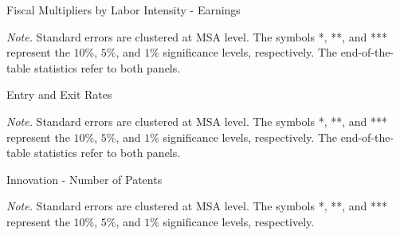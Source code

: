 \documentclass[dv_diss_main.tex]{subfiles}
\begin{document}
\newpage

\begin{table}[H]
    \begin{center}
    \caption{Fiscal Multipliers by Labor Intensity - Earnings}
    \label{tab:fm_labint}
	\resizebox{\textwidth}{!}{
    
    }
    \end{center}
        
    \footnotesize{\textit{Note. } Standard errors are clustered at MSA level. The symbols *, **, and *** represent the $10\%$, $5\%$, and $1\%$ significance levels, respectively. The end-of-the-table statistics refer to both panels.}
    
\end{table}
\newpage

\begin{table}[H]
    \begin{center}
    \caption{Entry and Exit Rates}
    \label{tab:entry_rate}
	\resizebox{!}{!}{
    
    }
    \end{center}
    \footnotesize{\textit{Note. } Standard errors are clustered at MSA level. The symbols *, **, and *** represent the $10\%$, $5\%$, and $1\%$ significance levels, respectively. The end-of-the-table statistics refer to both panels.}
\end{table}

\newpage

\begin{table}[H]
    \begin{center}
    \caption{Innovation - Number of Patents}
    \label{tab:patent}
	\resizebox{!}{!}{
    
    }
    \end{center}
    
    \footnotesize{\textit{Note.} Standard errors are clustered at MSA level. The symbols *, **, and *** represent the $10\%$, $5\%$, and $1\%$ significance levels, respectively.}
        
    
\end{table}




\end{document}
